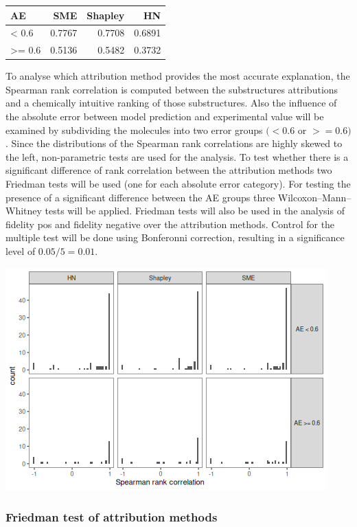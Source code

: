 \documentclass[
  12pt,
  a4paper]{article}
\author{}
\date{\vspace{-2.5em}}
\begin{document}
\begin{longtable}[]{@{}lrrr@{}}
\toprule\noalign{}
AE & SME & Shapley & HN \\
\midrule\noalign{}
\endhead
\bottomrule\noalign{}
\endlastfoot
\textless{} 0.6 & 0.7767 & 0.7708 & 0.6891 \\
\textgreater= 0.6 & 0.5136 & 0.5482 & 0.3732 \\
\end{longtable}

To analyse which attribution method provides the most accurate
explanation, the Spearman rank correlation is computed between the
substructures attributions and a chemically intuitive ranking of those
substructures. Also the influence of the absolute error between model
prediction and experimental value will be examined by subdividing the
molecules into two error groups \((<0.6\) or \(>=0.6)\). Since the distributions of
the Spearman rank correlations are highly skewed to the left,
non-parametric tests are used for the analysis. To test whether there is
a significant difference of rank correlation between the attribution
methods two Friedman tests will be used (one for each absolute error
category). For testing the presence of a significant difference between
the AE groups three Wilcoxon--Mann--Whitney tests will be applied.
Friedman tests will also be used in the analysis of fidelity pos and
fidelity negative over the attribution methods. Control for the multiple
test will be done using Bonferonni correction, resulting in a significance level of
\(0.05/5 = 0.01\).

\includegraphics{statistical_test_files/figure-latex/distributions-1.png}

\newpage

\hypertarget{friedman-test-of-attribution-methods}{%
\subsubsection{Friedman test of attribution
methods}\label{friedman-test-of-attribution-methods}}
\end{document}
